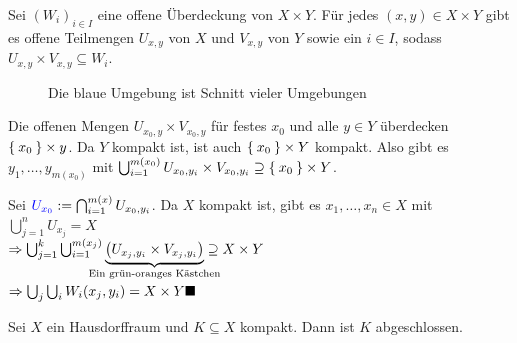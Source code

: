 \begin{beweis}
    Sei $(W_i)_{i \in I}$ eine offene Überdeckung von $X \times Y$.
    Für jedes $(x,y) \in X \times Y$ gibt es offene Teilmengen
    $U_{x,y}$ von $X$ und $V_{x,y}$ von $Y$ sowie ein $i \in I$, sodass
    $U_{x,y} \times V_{x,y} \subseteq W_i$.

    \begin{figure}[htp]
        \centering
        
        \caption{Die blaue Umgebung ist Schnitt vieler Umgebungen}
    \end{figure}

    Die offenen Mengen $U_{x_0, y} \times V_{x_0, y}$ für festes $x_0$
    und alle $y \in Y$ überdecken $\Set{x_0} \times y$. Da $Y$ kompakt
    ist, ist auch $\Set{x_0} \times Y$ kompakt. Also gibt es 
    $y_1, \dots, y_{m(x_0)}$ mit 
    $\bigcup_{i=1}^{m(x_0)} U_{x_0, y_i} \times V_{x_0, y_i} \supseteq \Set{x_0} \times Y$.

    Sei ${\color{blue} U_{x_0}} := \bigcap_{i=1}^{m(x)} U_{x_0, y_i}$.
    Da $X$ kompakt ist, gibt es $x_1, \dots, x_n \in X$ mit 
    $\bigcup_{j=1}^n U_{x_j} = X$\\
    $\Rightarrow \bigcup_{j=1}^k \bigcup_{i=1}^{m(x_j)} \underbrace{\left ( U_{x_j, y_i} \times V_{x_j, y_i} \right)}_{\mathclap{\text{Ein grün-oranges Kästchen}}} \supseteq X \times Y$\\
    $\Rightarrow \bigcup_j \bigcup_i W_i (x_j, y_i) = X \times Y \qed$
\end{beweis}

\begin{bemerkung}\label{hausdorffraumKompakteTeilmengeAbgeschlossen}
    Sei $X$ ein Hausdorffraum und $K \subseteq X$ kompakt.
    Dann ist $K$ abgeschlossen.
\end{bemerkung}

